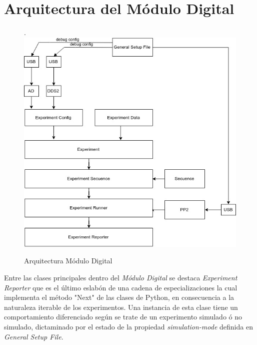 \section{Arquitectura del M\'odulo Digital}
\begin{figure}[!htb].
    \includegraphics[width=\linewidth]{../figures/d19.jpg}
    \caption{Arquitectura M\'odulo Digital}
    \label{fig:d19}
\end{figure}

Entre las clases principales dentro del \textit{M\'odulo Digital} se destaca \textit{Experiment Reporter}
que es el \'ultimo eslab\'on de una cadena de especializaciones la cual implementa el m\'etodo "Next" de las clases
de Python, en consecuencia a la naturaleza iterable de los experimentos. 
Una instancia de esta clase tiene un comportamiento diferenciado seg\'un se trate de un experimento simulado \'o no simulado, dictaminado por el estado de la propiedad \textit{simulation-mode} definida en \textit{General Setup File}.

\newpage